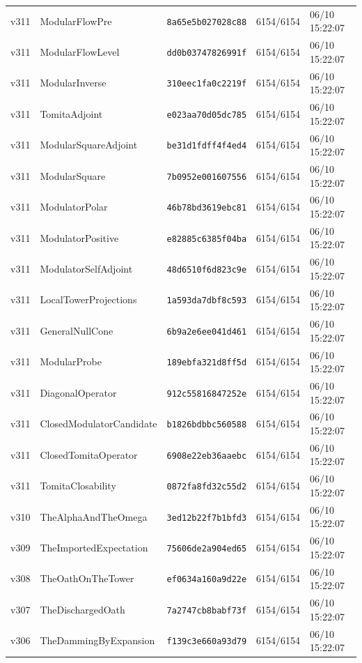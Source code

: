 \documentclass[11pt]{article}
\theoremstyle{definition}\newtheorem{deriv}{Derivation}
\begin{document}
{\begin{longtable}{@{}lllll@{}}
v311 & ModularFlowPre & \texttt{8a65e5b027028c88} & 6154/6154 & 06/10 15:22:07 \\
v311 & ModularFlowLevel & \texttt{dd0b03747826991f} & 6154/6154 & 06/10 15:22:07 \\
v311 & ModularInverse & \texttt{310eec1fa0c2219f} & 6154/6154 & 06/10 15:22:07 \\
v311 & TomitaAdjoint & \texttt{e023aa70d05dc785} & 6154/6154 & 06/10 15:22:07 \\
v311 & ModularSquareAdjoint & \texttt{be31d1fdff4f4ed4} & 6154/6154 & 06/10 15:22:07 \\
v311 & ModularSquare & \texttt{7b0952e001607556} & 6154/6154 & 06/10 15:22:07 \\
v311 & ModulatorPolar & \texttt{46b78bd3619ebc81} & 6154/6154 & 06/10 15:22:07 \\
v311 & ModulatorPositive & \texttt{e82885c6385f04ba} & 6154/6154 & 06/10 15:22:07 \\
v311 & ModulatorSelfAdjoint & \texttt{48d6510f6d823c9e} & 6154/6154 & 06/10 15:22:07 \\
v311 & LocalTowerProjections & \texttt{1a593da7dbf8c593} & 6154/6154 & 06/10 15:22:07 \\
v311 & GeneralNullCone & \texttt{6b9a2e6ee041d461} & 6154/6154 & 06/10 15:22:07 \\
v311 & ModularProbe & \texttt{189ebfa321d8ff5d} & 6154/6154 & 06/10 15:22:07 \\
v311 & DiagonalOperator & \texttt{912c55816847252e} & 6154/6154 & 06/10 15:22:07 \\
v311 & ClosedModulatorCandidate & \texttt{b1826bdbbc560588} & 6154/6154 & 06/10 15:22:07 \\
v311 & ClosedTomitaOperator & \texttt{6908e22eb36aaebc} & 6154/6154 & 06/10 15:22:07 \\
v311 & TomitaClosability & \texttt{0872fa8fd32c55d2} & 6154/6154 & 06/10 15:22:07 \\
v310 & TheAlphaAndTheOmega & \texttt{3ed12b22f7b1bfd3} & 6154/6154 & 06/10 15:22:07 \\
v309 & TheImportedExpectation & \texttt{75606de2a904ed65} & 6154/6154 & 06/10 15:22:07 \\
v308 & TheOathOnTheTower & \texttt{ef0634a160a9d22e} & 6154/6154 & 06/10 15:22:07 \\
v307 & TheDischargedOath & \texttt{7a2747cb8babf73f} & 6154/6154 & 06/10 15:22:07 \\
v306 & TheDammingByExpansion & \texttt{f139c3e660a93d79} & 6154/6154 & 06/10 15:22:07 \\

\end{longtable}}
\end{document}
